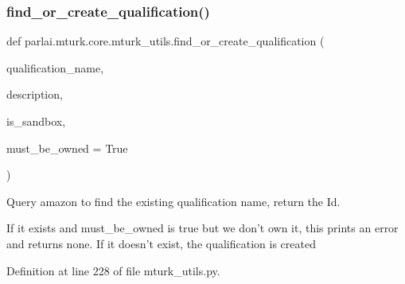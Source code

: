 \subsubsection{\texorpdfstring{find\+\_\+or\+\_\+create\+\_\+qualification()}{find\_or\_create\_qualification()}}
{\footnotesize\ttfamily def parlai.\+mturk.\+core.\+mturk\+\_\+utils.\+find\+\_\+or\+\_\+create\+\_\+qualification (\begin{DoxyParamCaption}\item[{}]{qualification\+\_\+name,  }\item[{}]{description,  }\item[{}]{is\+\_\+sandbox,  }\item[{}]{must\+\_\+be\+\_\+owned = {\ttfamily True} }\end{DoxyParamCaption})}

\begin{DoxyVerb}Query amazon to find the existing qualification name, return the Id.

If it exists and must_be_owned is true but we don't own it, this prints an error and
returns none. If it doesn't exist, the qualification is created
\end{DoxyVerb}
 

Definition at line 228 of file mturk\+\_\+utils.\+py.


